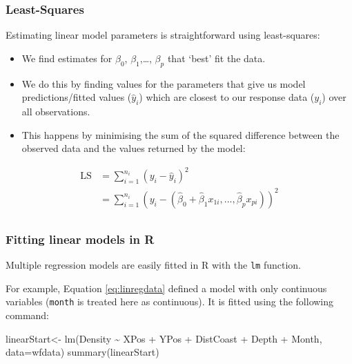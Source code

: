 \documentclass[
  oneside]{krantz}
\newenvironment{Shaded}{\begin{snugshade}}{\end{snugshade}}
\newcommand{\AttributeTok}[1]{\textcolor[rgb]{0.77,0.63,0.00}{#1}}
\newcommand{\FunctionTok}[1]{\textcolor[rgb]{0.00,0.00,0.00}{#1}}
\newcommand{\NormalTok}[1]{#1}
\newcommand{\OtherTok}[1]{\textcolor[rgb]{0.56,0.35,0.01}{#1}}
\newcommand{\SpecialCharTok}[1]{\textcolor[rgb]{0.00,0.00,0.00}{#1}}
\begin{document}
\hypertarget{least-squares}{%
\subsubsection{Least-Squares}\label{least-squares}}

Estimating linear model parameters is straightforward using least-squares:

\begin{itemize}
\item
  We find estimates for \(\beta_0\), \(\beta_1\),\ldots, \(\beta_p\) that `best' fit the data.
\item
  We do this by finding values for the parameters that give us model predictions/fitted values (\(\hat{y}_{i}\)) which are closest to our response data (\({y}_{i}\)) over all observations.
\item
  This happens by minimising the sum of the squared difference between the observed data and the values returned by the model:
\end{itemize}

\begin{align}
\textrm{LS} & = \sum_{i=1}^{n_i}(y_{i}-\hat{y}_{i})^2 \\
&=\sum_{i=1}^{n_i}(y_{i}-(\hat{\beta}_0 + \hat{\beta}_1x_{1i},...,\hat{\beta}_px_{pi}))^2 \\
\end{align}

\hypertarget{fitting-linear-models-in-r}{%
\subsubsection{Fitting linear models in R}\label{fitting-linear-models-in-r}}

Multiple regression models are easily fitted in R with the \texttt{lm} function.

For example, Equation \eqref{eq:linregdata} defined a model with only continuous variables (\texttt{month} is treated here as continuous). It is fitted using the following command:

\scriptsize

\begin{Shaded}
\begin{Highlighting}[]
\NormalTok{linearStart}\OtherTok{\textless{}{-}} \FunctionTok{lm}\NormalTok{(Density }\SpecialCharTok{\textasciitilde{}}\NormalTok{ XPos }\SpecialCharTok{+}\NormalTok{ YPos }\SpecialCharTok{+}\NormalTok{ DistCoast }\SpecialCharTok{+}\NormalTok{ Depth }\SpecialCharTok{+}\NormalTok{ Month, }\AttributeTok{data=}\NormalTok{wfdata)}
\FunctionTok{summary}\NormalTok{(linearStart)}
\end{Highlighting}
\end{Shaded}
\end{document}
